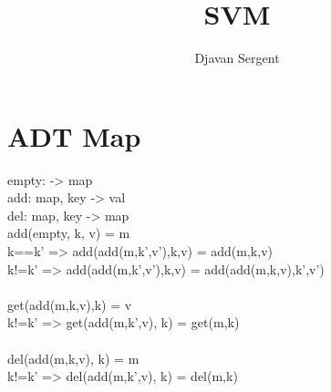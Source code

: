 \documentclass{article}
\begin{document}
	\title{SVM}
	\author{Djavan Sergent}
	\maketitle
	
	\section{ADT Map}
	empty: -> map\\
	add: map, key -> val \\
	del: map, key -> map \\
	add(empty, k, v) = m \\
	k==k' => add(add(m,k',v'),k,v) = add(m,k,v) \\
	k!=k' => add(add(m,k',v'),k,v) = add(add(m,k,v),k',v') \\
	\\
	get(add(m,k,v),k) = v \\
	k!=k' => get(add(m,k',v), k) = get(m,k) \\
	\\
	del(add(m,k,v), k) = m \\
	k!=k' => del(add(m,k',v), k) =  del(m,k) \\
	
	
	
\end{document}
